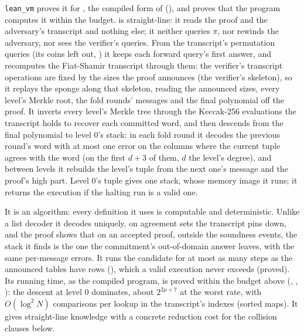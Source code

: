 \documentclass[11pt]{article}
\begin{document}
\texttt{lean\_vm} proves it for , the compiled form of
 (), and proves
that the program computes it within the budget.  is straight-line: it reads the proof and
the adversary's transcript and nothing else; it neither queries $\pi$, nor rewinds the adversary,
nor sees the verifier's queries. From the transcript's permutation queries (its coins left out,
) it keeps each forward query's first answer, and recomputes the
Fiat-Shamir transcript through them: the verifier's transcript operations are fixed by the sizes
the proof announces (the verifier's skeleton), so it replays the sponge along that skeleton, reading
the announced sizes, every level's Merkle root, the fold rounds' messages and the final
polynomial off the proof. It inverts every level's Merkle tree through the Keccak-256 evaluations
the transcript holds to recover each committed word, and then descends from the final polynomial to
level 0's stack: in each fold round it decodes the previous round's word with at most one error on
the columns where the current tuple agrees with the word (on the first $d + 3$ of them, $d$ the
level's degree), and between levels it rebuilds the level's tuple from the next one's message and
the proof's high part. Level 0's tuple gives one stack, whose memory image it runs; it returns the
execution if the halting run is a valid one.

It is an algorithm: every definition it uses is computable and deterministic. Unlike a list
decoder it decodes uniquely, on agreement sets the transcript pins down, and the proof shows that on
an accepted proof, outside the soundness events, the stack it finds is the one the commitment's
out-of-domain answer leaves, with the same per-message errors. It runs the candidate for at most as
many steps as the announced tables have rows (), which a valid execution never
exceeds (proved). Its running time, as the compiled program, is proved within the budget above
(, , ):
the descent at level 0 dominates, about $2^{2\mu + 7}$ at the worst rate, with $O(\log^2 N)$
comparisons per lookup in the transcript's indexes (sorted maps). It gives straight-line knowledge
with a concrete reduction cost for the collision clauses below.
\end{document}
